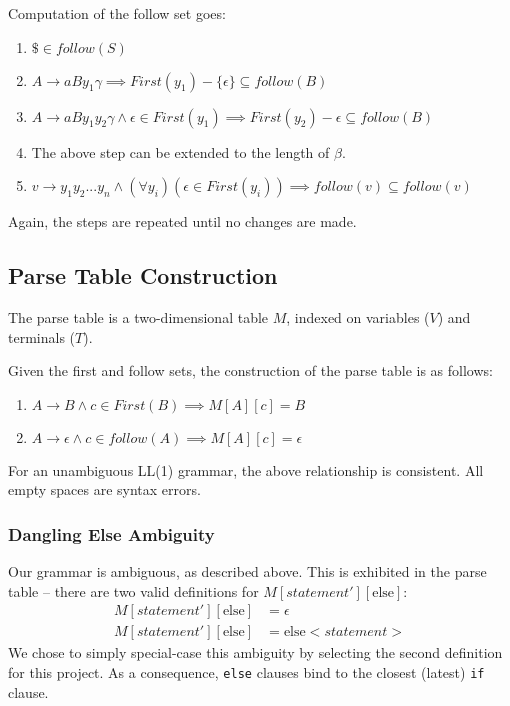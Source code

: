 \documentclass[titlepage]{article}
\newcommand{\ep}{\epsilon}
\begin{document}
		Computation of the follow set goes:
		\begin{enumerate}
			\item $\$ \in follow(S)$
			\item $A \rightarrow aBy_1\gamma \implies First(y_1) - \{\ep\} \subseteq follow(B)$
			\item $A \rightarrow aBy_1y_2\gamma \land \ep \in First(y_1) \implies First(y_2) - \ep \subseteq follow(B)$
			\item The above step can be extended to the length of $\beta$.
			\item $v \rightarrow y_1y_2...y_n \land (\forall y_i)(\ep \in First(y_i)) \implies follow(v) \subseteq follow(v)$
		\end{enumerate}
		Again, the steps are repeated until no changes are made.
		
		\subsection{Parse Table Construction}
		The parse table is a two-dimensional table $M$, indexed on variables ($V$) and terminals ($T$).

		Given the first and follow sets, the construction of the parse table is as follows:
		\begin{enumerate}
			\item $A \rightarrow B \land c \in First(B) \implies M[A][c] = B$
			\item $A \rightarrow \ep \land c \in follow(A) \implies M[A][c] = \ep$
		\end{enumerate}

		For an unambiguous LL(1) grammar, the above relationship is consistent. All empty spaces are syntax errors.

			\subsubsection{Dangling Else Ambiguity}
			Our grammar is ambiguous, as described above. This is exhibited in the parse table -- there are two valid definitions for $M[statement'][\textrm{else}]$:
			\begin{align*}
				M[statement'][\textrm{else}] &= \ep \\
				M[statement'][\textrm{else}] &= \textrm{else} <statement>
			\end{align*}
			We chose to simply special-case this ambiguity by selecting the second definition for this project. As a consequence, \texttt{else} clauses bind to the closest (latest) \texttt{if} clause.
\end{document}
